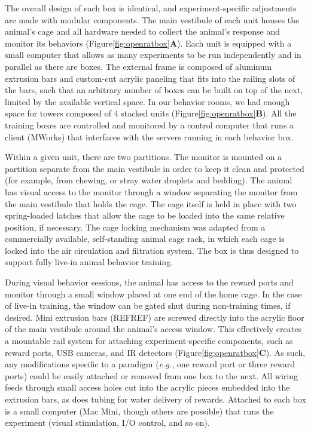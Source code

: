 The overall design of each box is identical, and experiment-specific adjustments are made with modular components. The main vestibule of each unit houses the animal's cage and all hardware needed to collect the animal's response and monitor its behaviors (Figure\ref{fig:openratbox}\textbf{A}). Each unit is equipped with a small computer that allows as many experiments to be run independently and in parallel as there are boxes. The external frame is composed of aluminum extrusion bars and custom-cut acrylic paneling that fits into the railing slots of the bars, such that an arbitrary number of boxes can be built on top of the next, limited by the available vertical space. In our behavior rooms, we had enough space for towers composed of 4 stacked units (Figure\ref{fig:openratbox}\textbf{B}). All the training boxes are controlled and monitored by a control computer that runs a client (MWorks) that interfaces with the servers running in each behavior box. 

Within a given unit, there are two partitions. The monitor is mounted on a partition separate from the main vestibule in order to keep it clean and protected (for example, from chewing, or stray water droplets and bedding). The animal has visual access to the monitor through a window separating the monitor from the main vestibule that holds the cage. The cage itself is held in place with two spring-loaded latches that allow the cage to be loaded into the same relative position, if necessary. The cage locking mechanism was adapted from a commercially available, self-standing animal cage rack, in which each cage is locked into the air circulation and filtration system. The box is thus designed to support fully live-in animal behavior training. 

During visual behavior sessions, the animal has access to the reward ports and monitor through a small window placed at one end of the home cage. In the case of live-in training, the window can be gated shut during non-training times, if desired. Mini extrusion bars (REFREF) are screwed directly into the acrylic floor of the main vestibule around the animal's access window. This effectively creates a mountable rail system for attaching experiment-specific components, such as reward ports, USB cameras, and IR detectors (Figure\ref{fig:openratbox}\textbf{C}). As such, any modifications specific to a paradigm (\textit{e.g.}, one reward port or three reward ports) could be easily attached or removed from one box to the next. All wiring feeds through small access holes cut into the acrylic pieces embedded into the extrusion bars, as does tubing for water delivery of rewards. Attached to each box is a small computer (Mac Mini, though others are possible) that runs the experiment (visual stimulation, I/O control, and so on). 

